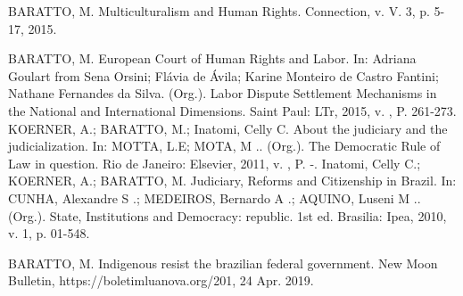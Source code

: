 

\begin{cvcitems}
  \cvcitem
    {BARATTO, M.}
    {Multiculturalism and Human Rights. Connection, v. V. 3, p. 5-17, 2015.}
\end{cvcitems}



\begin{cvcitems}
  \cvcitem
  {BARATTO, M.}
  {European Court of Human Rights and Labor. In: Adriana Goulart from Sena Orsini; Flávia de Ávila; Karine Monteiro de Castro Fantini; Nathane Fernandes da Silva. (Org.). Labor Dispute Settlement Mechanisms in the National and International Dimensions. Saint Paul: LTr, 2015, v. , P. 261-273.}
  \cvcitem
  {KOERNER, A.; BARATTO, M.; Inatomi, Celly C.}
  {About the judiciary and the judicialization. In: MOTTA, L.E; MOTA, M .. (Org.). The Democratic Rule of Law in question. Rio de Janeiro: Elsevier, 2011, v. , P. -.}
  \cvcitem
  {Inatomi, Celly C.; KOERNER, A.; BARATTO, M.}
  {Judiciary, Reforms and Citizenship in Brazil. In: CUNHA, Alexandre S .; MEDEIROS, Bernardo A .; AQUINO, Luseni M .. (Org.). State, Institutions and Democracy: republic. 1st ed. Brasilia: Ipea, 2010, v. 1, p. 01-548.}
\end{cvcitems}


\begin{cvcitems}
  \cvcitem
    {BARATTO, M.}
    {Indigenous resist the brazilian federal government. New Moon Bulletin, https://boletimluanova.org/201, 24 Apr. 2019.}
\end{cvcitems}


